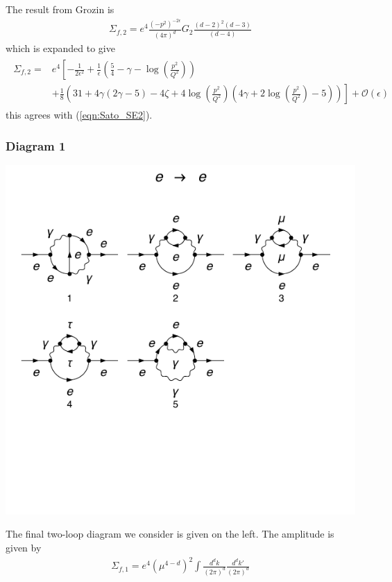 \documentclass[11pt]{article}
\begin{document}
The result from Grozin is
\begin{align}
\Sigma_{f,2} = e^4 \frac{(-p^2)^{-2\epsilon}}{(4\pi)^d} G_2   \frac{(d-2)^2(d-3)}{(d-4)}
\end{align}
which is expanded to give
\begin{align}
\begin{split}
\Sigma_{f,2} = &e^4 \left[ -\frac{1}{2\epsilon^2} + \frac{1}{\epsilon}\left(
\frac{5}{4}-\gamma-\log\left(\frac{p^2}{Q^2}\right)\right) \right.\\&\left.+ \frac{1}{8}\left(
31 +
4\gamma(2\gamma-5) - 4\zeta + 4\log\left(\frac{p^2}{Q^2}\right) \left( 4\gamma+2\log\left(\frac{p^2}{Q^2}\right)-5\right)
 \right) \right] + \mathcal{O}(\epsilon)
\end{split}
\end{align}
this agrees with (\ref{eqn:Sato_SE2}).


\subsubsection{Diagram 1}
\noindent\begin{minipage}{0.3\textwidth}
\begin{center}
\includegraphics{QED_F_2loop_1.pdf}
\end{center}
\end{minipage}
\noindent\begin{minipage}{0.7\textwidth}

The final two-loop diagram we consider is given on the left.  The amplitude is given by
\begin{align}
\Sigma_{f,1} = e^4 (\mu^{4-d})^2 \int \frac{d^dk}{(2\pi)^d}  \frac{d^dk'}{(2\pi)^d}
\end{align}

\end{minipage}
\end{document}
